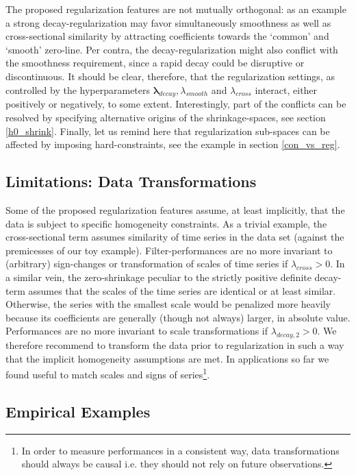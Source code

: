 \documentclass[a4paper]{book}
\begin{document}
The proposed regularization features are not mutually orthogonal: as an example a strong decay-regularization may favor simultaneously smoothness  as well as cross-sectional similarity by attracting coefficients towards the `common' and `smooth' zero-line. Per contra, the  decay-regularization might also conflict with the smoothness requirement, since a rapid decay could be disruptive or discontinuous. It should be clear, therefore, that the regularization settings, as controlled by the hyperparameters $\boldsymbol{\lambda}_{decay}, \lambda_{smooth}$ and $\lambda_{cross}$ interact, either positively or negatively, to some extent. Interestingly, part of the conflicts can be resolved by specifying alternative origins of the shrinkage-spaces, see section \ref{h0_shrink}. Finally, let us remind here that regularization sub-spaces can be affected by imposing hard-constraints, see the example in section \ref{con_vs_reg}. 



\subsection{Limitations: Data Transformations}

Some of the proposed regularization features assume, at least implicitly, that the data is subject to specific homogeneity constraints. As a trivial example, the cross-sectional term assumes similarity of  time series in the data set (against the premicesses of our toy example). Filter-performances are no more invariant to (arbitrary) sign-changes or transformation of scales of time series if $\lambda_{cross}>0$. In a similar vein, the zero-shrinkage peculiar to the strictly positive definite decay-term assumes that the scales of the time series are identical or at least similar. Otherwise, the series with the smallest scale would be penalized more heavily because its coefficients are generally (though not always) larger, in absolute value. Performances are no more invariant to scale transformations if $\lambda_{decay,2}>0$. We therefore recommend to transform the data prior to regularization in such a way that the implicit homogeneity assumptions are met. In applications so far we found useful to match scales and signs of series\footnote{In order to measure performances in a consistent way, data transformations should always be causal i.e. they should not rely on future observations.}.         




\subsection{Empirical Examples}
\end{document}
